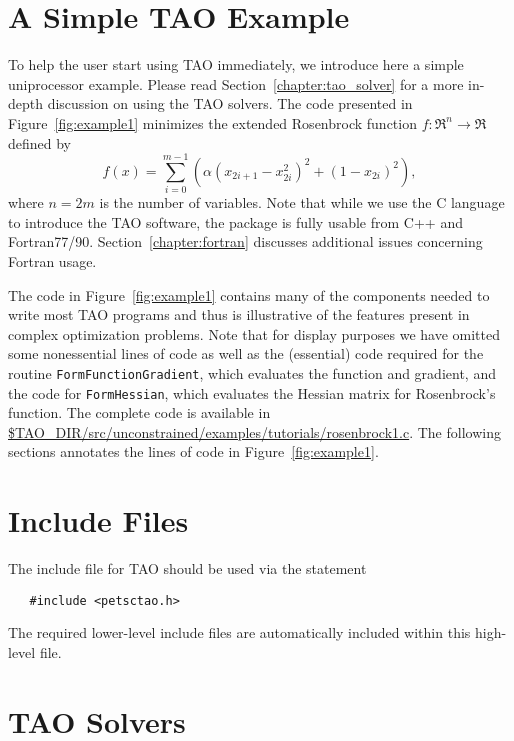 \section{A Simple TAO Example}
\label{sec:simple}

To help the user start using TAO immediately, we introduce here a simple
uniprocessor example. Please read Section~\ref{chapter:tao_solver} for a 
more in-depth discussion on using the TAO solvers.
The code presented in Figure~\ref{fig:example1} minimizes the
extended Rosenbrock function $f: \Re^n \to \Re$ defined by
\[
 f(x) = 
 \sum_{i=0}^{m-1} \left( \alpha(x_{2i+1}-x_{2i}^2)^2 + (1-x_{2i})^2 \right),
\]
where $n = 2m$ is the number of variables.  Note that while we use the C 
language to introduce the TAO software, the package is fully usable from 
C++ and Fortran77/90.  Section~\ref{chapter:fortran} discusses additional 
issues concerning Fortran usage.



The code in Figure~\ref{fig:example1} contains many of the components
needed to write most TAO programs and thus is illustrative of the
features present in complex optimization problems.  Note that for
display purposes we have omitted some nonessential lines of code as well as the
(essential) code required for the routine \texttt{FormFunctionGradient},
which evaluates the function and gradient, and the code for
\texttt{FormHessian}, which evaluates the Hessian matrix for Rosenbrock's
function. The complete code is available in \url{$TAO\_DIR/src/unconstrained/examples/tutorials/rosenbrock1.c}. %
The following sections annotates the lines of code in
Figure~\ref{fig:example1}.

\section{Include Files}

The include file for TAO should be used via the statement
\begin{verbatim}
   #include <petsctao.h>
\end{verbatim}
\noindent
The required lower-level include files are automatically included
within this high-level file.

\section{TAO Solvers}


